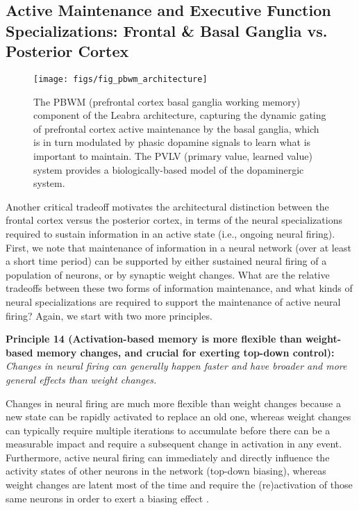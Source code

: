 \documentclass[11pt,twoside]{article}
\begin{document}
\subsection{Active Maintenance and Executive Function Specializations: Frontal
  \& Basal Ganglia vs. Posterior Cortex}

\begin{figure}
  \centering\texttt{[image: figs/fig\_pbwm\_architecture]}
  \caption{\small The PBWM (prefrontal cortex basal ganglia working
    memory) component of the Leabra architecture, capturing the dynamic gating
    of prefrontal cortex active maintenance by the basal ganglia, which is in
    turn modulated by phasic dopamine signals to learn what is important to
    maintain.  The PVLV (primary value, learned value) system provides a
    biologically-based model of the dopaminergic system. }
  \label{fig.pbwm_architecture}
\end{figure}

Another critical tradeoff motivates the architectural distinction between the
frontal cortex versus the posterior cortex, in terms of the neural
specializations required to sustain information in an active state (i.e.,
ongoing neural firing).  First, we note that maintenance of information in a
neural network (over at least a short time period) can be supported by either
sustained neural firing of a population of neurons, or by synaptic weight
changes.  What are the relative tradeoffs between these two forms of
information maintenance, and what kinds of neural specializations are required
to support the maintenance of active neural firing?  Again, we start with two
more principles.

{\bf Principle 14 (Activation-based memory is more flexible than weight-based
  memory changes, and crucial for exerting top-down control):} {\em Changes in
  neural firing can generally happen faster and have broader and more general
  effects than weight changes.}

Changes in neural firing are much more flexible than weight changes because a
new state can be rapidly activated to replace an old one, whereas weight
changes can typically require multiple iterations to accumulate before there
can be a measurable impact and require a subsequent change in activation in
any event.  Furthermore, active neural firing can immediately and directly
influence the activity states of other neurons in the network (top-down
biasing), whereas weight changes are latent most of the time and require the
(re)activation of those same neurons in order to exert a biasing effect
\cite{MortonMunakata02}.
\end{document}
